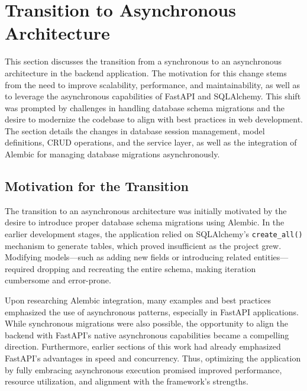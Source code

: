 \section{Transition to Asynchronous Architecture}
This section discusses the transition from a synchronous to an asynchronous architecture in the backend application. The motivation for this change stems from the need to improve scalability, performance, and maintainability, as well as to leverage the asynchronous capabilities of FastAPI and SQLAlchemy. This shift was prompted by challenges in handling database schema migrations and the desire to modernize the codebase to align with best practices in web development. The section details the changes in database session management, model definitions, CRUD operations, and the service layer, as well as the integration of Alembic for managing database migrations asynchronously.

\subsection{Motivation for the Transition}

The transition to an asynchronous architecture was initially motivated by the desire to introduce proper database schema migrations using Alembic. In the earlier development stages, the application relied on SQLAlchemy's \texttt{create\_all()} mechanism to generate tables, which proved insufficient as the project grew. Modifying models—such as adding new fields or introducing related entities—required dropping and recreating the entire schema, making iteration cumbersome and error-prone.

Upon researching Alembic integration, many examples and best practices emphasized the use of asynchronous patterns, especially in FastAPI applications. While synchronous migrations were also possible, the opportunity to align the backend with FastAPI's native asynchronous capabilities became a compelling direction. Furthermore, earlier sections of this work had already emphasized FastAPI's advantages in speed and concurrency. Thus, optimizing the application by fully embracing asynchronous execution promised improved performance, resource utilization, and alignment with the framework's strengths.

